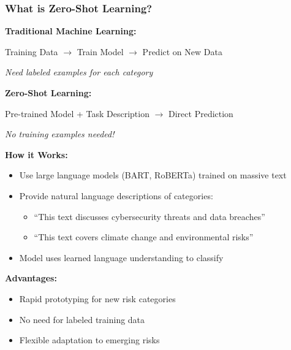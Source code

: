 \documentclass[aspectratio=169]{beamer}
\begin{document}
\begin{frame}
\frametitle{What is Zero-Shot Learning?}

\textbf{Traditional Machine Learning:}
\begin{center}
Training Data $\rightarrow$ Train Model $\rightarrow$ Predict on New Data
\end{center}
\textit{Need labeled examples for each category}

\vspace{0.5cm}

\textbf{Zero-Shot Learning:}
\begin{center}
Pre-trained Model + Task Description $\rightarrow$ Direct Prediction
\end{center}
\textit{No training examples needed!}

\vspace{0.5cm}

\textbf{How it Works:}
\begin{itemize}
\item Use large language models (BART, RoBERTa) trained on massive text
\item Provide natural language descriptions of categories:
\begin{itemize}
\item ``This text discusses cybersecurity threats and data breaches''
\item ``This text covers climate change and environmental risks''
\end{itemize}
\item Model uses learned language understanding to classify
\end{itemize}

\vspace{0.3cm}

\textbf{Advantages:}
\begin{itemize}
\item Rapid prototyping for new risk categories
\item No need for labeled training data
\item Flexible adaptation to emerging risks
\end{itemize}

\end{frame}
%
%
\end{document}
